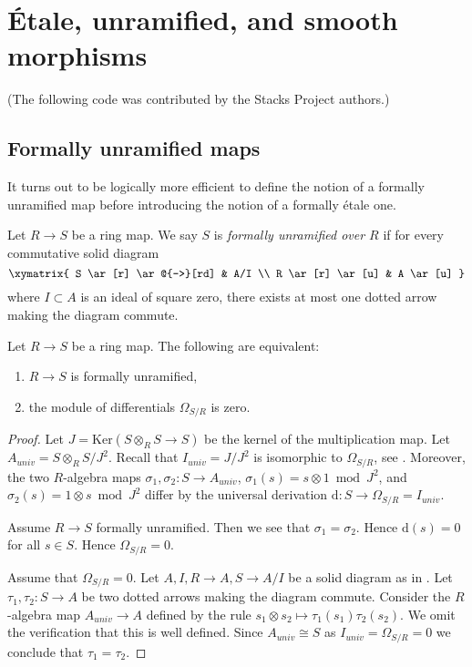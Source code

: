 \chapter{\'Etale, unramified, and smooth morphisms}

(The following code was contributed by the Stacks Project authors.)
\section{Formally unramified maps}
\label{section-formally-unramified}

\noindent
It turns out to be logically more efficient to define
the notion of a formally unramified map before introducing
the notion of a formally \'etale one.

\begin{definition}
\label{definition-formally-unramified}
Let $R \to S$ be a ring map.
We say $S$ is {\it formally unramified over $R$} if for every
commutative solid diagram
$$
\xymatrix{
S \ar[r] \ar@{-->}[rd] & A/I \\
R \ar[r] \ar[u] & A \ar[u]
}
$$
where $I \subset A$ is an ideal of square zero, there exists
at most one dotted arrow making the diagram commute.
\end{definition}

\begin{lemma}
\label{lemma-characterize-formally-unramified}
Let $R \to S$ be a ring map.
The following are equivalent:
\begin{enumerate}
\item $R \to S$ is formally unramified,
\item the module of differentials $\Omega_{S/R}$ is zero.
\end{enumerate}
\end{lemma}

\begin{proof}
Let $J = \text{Ker}(S \otimes_R S \to S)$ be the kernel of
the multiplication map. Let $A_{univ} = S \otimes_R S/J^2$. Recall
that $I_{univ} = J/J^2$ is isomorphic to $\Omega_{S/R}$, see
. Moreover, the two $R$-algebra maps
$\sigma_1, \sigma_2 : S \to A_{univ}$, $\sigma_1(s) = s \otimes 1 \bmod J^2$,
and $\sigma_2(s) = 1 \otimes s \bmod J^2$ differ by the
universal derivation $\text{d} : S \to \Omega_{S/R} = I_{univ}$.

\medskip\noindent
Assume $R \to S$ formally unramified.
Then we see that $\sigma_1 = \sigma_2$.
Hence $\text{d}(s) = 0$ for all $s \in S$.
Hence $\Omega_{S/R} = 0$.

\medskip\noindent
Assume that $\Omega_{S/R} = 0$. Let $A, I, R \to A, S \to A/I$
be a solid diagram as in .
Let $\tau_1, \tau_2 : S \to A$ be two dotted arrows making the
diagram commute. Consider the $R$-algebra map $A_{univ} \to A$
defined by the rule $s_1 \otimes s_2 \mapsto \tau_1(s_1)\tau_2(s_2)$.
We omit the verification that this is well defined. Since $A_{univ} \cong S$
as $I_{univ} = \Omega_{S/R} = 0$ we conclude that $\tau_1 = \tau_2$.
\end{proof}


